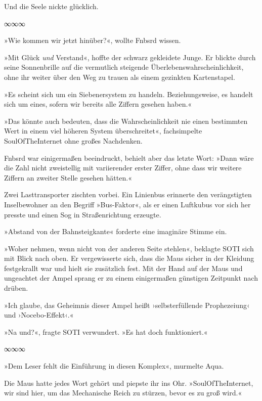 Und die Seele nickte glücklich.

\begin{center}
∞∞∞
\end{center}

»Wie kommen wir jetzt hinüber?«, wollte Fnbsrd wissen.

»Mit Glück \emph{und} Verstand«, hoffte der schwarz gekleidete Junge. Er blickte durch seine Sonnenbrille auf die vermutlich steigende Überlebenswahrscheinlichkeit, ohne ihr weiter über den Weg zu trauen als einem gezinkten Kartenstapel.

»Es scheint sich um ein Siebenersystem zu handeln. Beziehungsweise, es handelt sich um eines, sofern wir bereits alle Ziffern gesehen haben.«

»Das könnte auch bedeuten, dass die Wahrscheinlichkeit nie einen bestimmten Wert in einem viel höheren System überschreitet«, fachsimpelte SoulOfTheInternet ohne großes Nachdenken.

Fnbsrd war einigermaßen beeindruckt, behielt aber das letzte Wort: »Dann wäre die Zahl nicht zweistellig mit variierender erster Ziffer, ohne dass wir weitere Ziffern an zweiter Stelle gesehen hätten.«

Zwei Lasttransporter zischten vorbei. Ein Linienbus erinnerte den verängstigten Inselbewohner an den Begriff »Bus-Faktor«, als er einen Luftkubus vor sich her presste und einen Sog in Straßenrichtung erzeugte.

»Abstand von der Bahnsteigkante« forderte eine imaginäre Stimme ein.

»Woher nehmen, wenn nicht von der anderen Seite stehlen«, beklagte SOTI sich mit Blick nach oben. Er vergewisserte sich, dass die Maus sicher in der Kleidung festgekrallt war und hielt sie zusätzlich fest. Mit der Hand auf der Maus und ungeachtet der Ampel sprang er zu einem einigermaßen günstigen Zeitpunkt nach drüben.

»Ich glaube, das Geheimnis dieser Ampel heißt ›selbsterfüllende Prophezeiung‹ und ›Nocebo-Effekt‹.«

»Na und?«, fragte SOTI verwundert. »Es hat doch funktioniert.«

\begin{center}
∞∞∞
\end{center}

»Dem Leser fehlt die Einführung in diesen Komplex«, murmelte Aqua.

Die Maus hatte jedes Wort gehört und piepste ihr ins Ohr. »SoulOfTheInternet, wir sind hier, um das Mechanische Reich zu stürzen, bevor es zu groß wird.«

